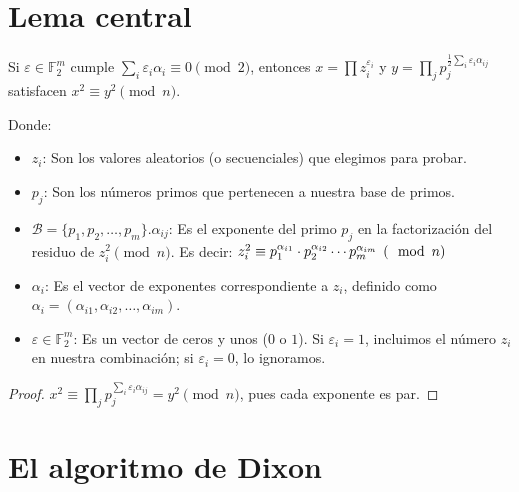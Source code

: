 \section{Lema central}

\begin{lema}
Si $\varepsilon \in \mathbb{F}_2^m$ cumple
$\sum_i \varepsilon_i \alpha_i \equiv 0 \pmod 2$, entonces
$x = \prod z_i^{\varepsilon_i}$ y
$y = \prod_j p_j^{\frac{1}{2}\sum_i \varepsilon_i \alpha_{ij}}$
satisfacen $x^2 \equiv y^2 \pmod n$.

Donde:
\begin{itemize}
\item \(z_{i}\): Son los valores aleatorios (o secuenciales) que elegimos para probar.
\item \(p_{j}\): Son los números primos que pertenecen a nuestra base de primos.
\item \(\mathcal{B} = \{p_1, p_2, \dots, p_m\}\).\(\alpha _{ij}\): Es el exponente del primo
 \(p_{j}\) en la factorización del residuo de \(z_i^2 \pmod n\). Es decir: \(z_{i}^{2}\equiv p_{1}^{\alpha _{i1}}\cdot p_{2}^{\alpha _{i2}}\cdots p_{m}^{\alpha _{im}}\mathinner{\;\left(\mod \,n\right)}\)
 \item \(\alpha _{i}\): Es el vector de exponentes correspondiente a \(z_{i}\), definido como 
 \(\alpha_i = (\alpha_{i1}, \alpha_{i2}, \dots, \alpha_{im})\).
\item \(\varepsilon \in \mathbb{F}_2^m\): Es un vector de ceros y unos (\(0\) o \(1\)). Si \(\varepsilon_i = 1\), incluimos el número \(z_{i}\) en nuestra combinación; si \(\varepsilon_i = 0\), lo ignoramos.
\end{itemize}
\end{lema}

\begin{proof}
$x^2 \equiv \prod_j p_j^{\sum_i \varepsilon_i \alpha_{ij}} = y^2 \pmod n$,
pues cada exponente es par.
\end{proof}

\section{El algoritmo de Dixon}

